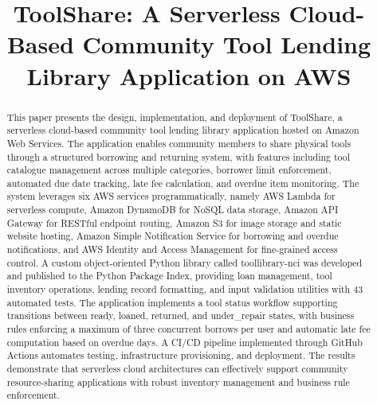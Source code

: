 \documentclass[conference]{IEEEtran}
\begin{document}
\title{ToolShare: A Serverless Cloud-Based Community Tool Lending Library Application on AWS}

\author{
}

\maketitle

\begin{abstract}
This paper presents the design, implementation, and deployment of ToolShare, a serverless cloud-based community tool lending library application hosted on Amazon Web Services. The application enables community members to share physical tools through a structured borrowing and returning system, with features including tool catalogue management across multiple categories, borrower limit enforcement, automated due date tracking, late fee calculation, and overdue item monitoring. The system leverages six AWS services programmatically, namely AWS Lambda for serverless compute, Amazon DynamoDB for NoSQL data storage, Amazon API Gateway for RESTful endpoint routing, Amazon S3 for image storage and static website hosting, Amazon Simple Notification Service for borrowing and overdue notifications, and AWS Identity and Access Management for fine-grained access control. A custom object-oriented Python library called toollibrary-nci was developed and published to the Python Package Index, providing loan management, tool inventory operations, lending record formatting, and input validation utilities with 43 automated tests. The application implements a tool status workflow supporting transitions between ready, loaned, returned, and under\_repair states, with business rules enforcing a maximum of three concurrent borrows per user and automatic late fee computation based on overdue days. A CI/CD pipeline implemented through GitHub Actions automates testing, infrastructure provisioning, and deployment. The results demonstrate that serverless cloud architectures can effectively support community resource-sharing applications with robust inventory management and business rule enforcement.
\end{abstract}
\end{document}
